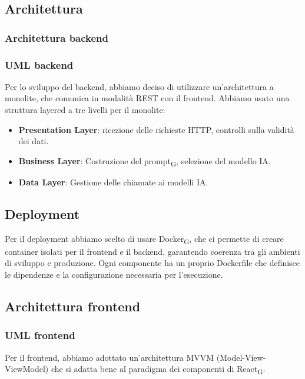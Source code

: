 \documentclass[11pt,a4paper]{article}
\newcommand{\gls}[1]{#1\textsubscript{G}}
\begin{document}
\subsection{Architettura}
\subsubsection{Architettura backend}
\subsubsection{UML backend}
Per lo sviluppo del backend, abbiamo deciso di utilizzare un'architettura a monolite, che comunica in modalità REST con il frontend. 
Abbiamo usato una struttura layered a tre livelli per il monolite:
\begin{itemize}
    \item \textbf{Presentation Layer}: ricezione delle richieste HTTP, controlli sulla validità dei dati. \\
    \item \textbf{Business Layer}: Costruzione del \gls{prompt}, selezione del modello IA. \\
    \item \textbf{Data Layer}: Gestione delle chiamate ai modelli IA. \\
\end{itemize}

\subsection{Deployment}
Per il deployment abbiamo scelto di usare \gls{Docker}, che ci permette di creare container isolati per il frontend e il backend, 
garantendo coerenza tra gli ambienti di sviluppo e produzione. Ogni componente ha un proprio Dockerfile che definisce 
le dipendenze e la configurazione necessaria per l'esecuzione. \\

\subsection{Architettura frontend}
\subsubsection{UML frontend}
Per il frontend, abbiamo adottato un'architettura MVVM (Model-View-ViewModel) che si adatta bene al paradigma dei componenti di \gls{React}.

\subsection{}
\end{document}

